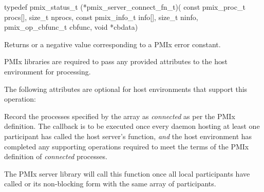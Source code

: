 \format

\cspecificstart
\begin{codepar}
typedef pmix_status_t (*pmix_server_connect_fn_t)(
                             const pmix_proc_t procs[],
                             size_t nprocs,
                             const pmix_info_t info[],
                             size_t ninfo,
                             pmix_op_cbfunc_t cbfunc,
                             void *cbdata)
\end{codepar}
\cspecificend

\begin{arglist}
\end{arglist}

Returns  or a negative value corresponding to a \ac{PMIx} error constant.

\reqattrstart
\ac{PMIx} libraries are required to pass any provided attributes to the host environment for processing.
\reqattrend

\optattrstart
The following attributes are optional for host environments that support this operation:


\optattrend

\descr

Record the processes specified by the  array as \textit{connected} as per the \ac{PMIx} definition. The callback is to be executed once every daemon hosting at least one participant has called the host server's  function, \textit{and} the host environment has completed any supporting operations required to meet the terms of the \ac{PMIx} definition of \textit{connected} processes.

\advicermstart
The \ac{PMIx} server library will
call this function once all local participants have called  or its non-blocking form with the same array of participants.
\advicermend

